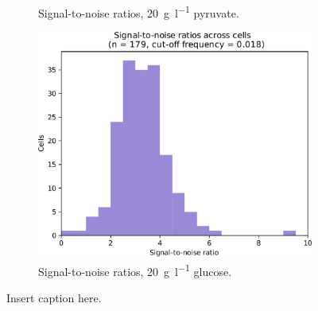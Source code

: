 \begin{figure}
\begin{subfigure}[t]{0.3\textwidth}
   \caption{
     Signal-to-noise ratios, \SI{20}{\gram~\litre^{-1}} pyruvate.
   }
   \label{fig:biology-pyruvate-snr}
  \end{subfigure}%
  \begin{subfigure}[t]{0.3\textwidth}
   \centering
   \includegraphics[width=\textwidth]{glucose_snr_edit.pdf}
   \caption{
     Signal-to-noise ratios, \SI{20}{\gram~\litre^{-1}} glucose.
   }
   \label{fig:biology-highglc-snr}
  \end{subfigure}

  \caption{
    Insert caption here.
  }
  \label{fig:biology-compare-snr}
\end{figure}


